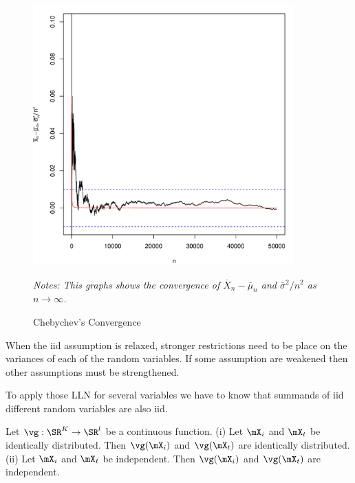 \documentclass[english,12pt]{book}\usepackage[]{graphicx}\usepackage[]{xcolor}
\newenvironment{knitrout}{}{} %
\begin{document}
\begin{figure}[H]
  \caption{Chebychev's Convergence}
    \label{fig:chebychev}
         \centering
    \begin{minipage}{.9\linewidth}
\begin{knitrout}
\color{fgcolor}

{\centering \includegraphics[width=10cm,height=10cm]{figure/cheby-convergence-1} 

}


\end{knitrout}
\footnotesize
		\emph{Notes: This graphs shows the convergence of $\bar{X}_n - \bar{\mu}_n$ and $\bar{\sigma}^2 / n^2$ as $n\to\infty$.}
	\end{minipage}
\end{figure}

\begin{remark}
  When the iid assumption is relaxed, stronger restrictions need to be place on the variances of each of the random variables. If some assumption are weakened then other assumptions must be strengthened. 
\end{remark}

To apply those LLN for several variables we have to know that summands of iid different random variables are also iid.

\begin{proposition}
	Let $\vg:\SR^K\to \SR^l$ be a continuous function. (i) Let $\mX_i$ and $\mX_t$ be identically distributed. Then $\vg(\mX_i)$ and $\vg(\mX_t)$ are identically distributed. (ii) Let $\mX_i$ and $\mX_t$ be independent. Then $\vg(\mX_i)$ and $\vg(\mX_t)$ are independent.
\end{proposition}
\end{document}
